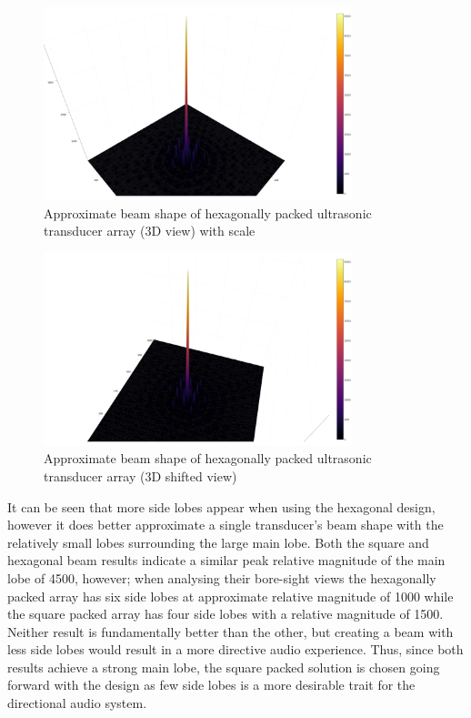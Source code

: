 \begin{figure}[ht!]
    \centering
    \includegraphics[width=0.8\textwidth]{Figures/arraySim/hex/beampat3dplaneview.png}
    \caption{Approximate beam shape of hexagonally packed ultrasonic transducer array (3D view) with scale}
    \label{fig:hex_elem_3Dbeamscale}
\end{figure}

\begin{figure}[ht!]
    \centering
    \includegraphics[width=0.8\textwidth]{Figures/arraySim/hex/beampat3d.png}
    \caption{Approximate beam shape of hexagonally packed ultrasonic transducer array (3D shifted view)}
    \label{fig:hex_elem_3Dbeam}
\end{figure}

\newpage
It can be seen that more side lobes appear when using the hexagonal design, however it does better approximate a single transducer's beam shape with the relatively small lobes surrounding the large main lobe.
Both the square and hexagonal beam results indicate a similar peak relative magnitude of the main lobe of 4500, however; when analysing their bore-sight views the hexagonally packed array has six side lobes at approximate relative magnitude of 1000 while the square packed array has four side lobes with a relative magnitude of 1500. Neither result is fundamentally better than the other, but creating a beam with less side lobes would result in a more directive audio experience. Thus, since both results achieve a strong main lobe, the square packed solution is chosen going forward with the design as few side lobes is a more desirable trait for the directional audio system.
\newpage


